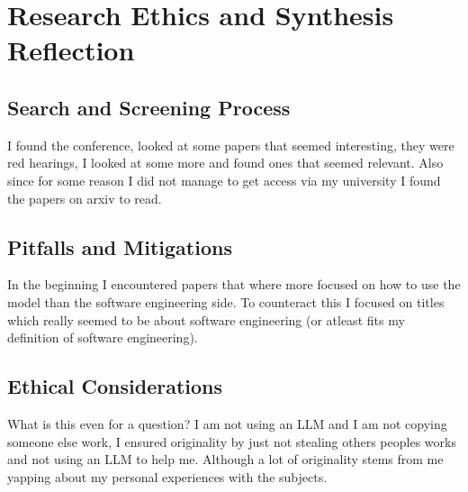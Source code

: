 \documentclass{article}
\begin{document}
\section{Research Ethics and Synthesis Reflection}
\subsection{Search and Screening Process}
I found the conference, looked at some papers that seemed interesting, they were red hearings, I looked at some more and found ones that seemed relevant. Also since for some reason I did not manage to get access via my university I found the papers on arxiv to read.

\subsection{Pitfalls and Mitigations}
In the beginning I encountered papers that where more focused on how to use the model than the software engineering side. To counteract this I focused on titles which really seemed to be about software engineering (or atleast fits my definition of software engineering).
\subsection{Ethical Considerations}
What is this even for a question? I am not using an LLM and I am not copying someone else work, I ensured originality by just not stealing others peoples works and not using an LLM to help me. Although a lot of originality stems from me yapping about my personal experiences with the subjects.
\end{document}
